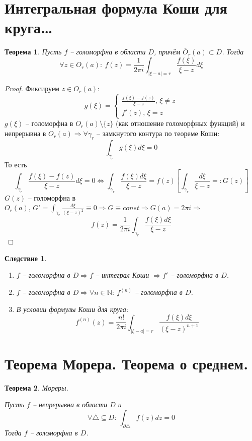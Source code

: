 \documentclass[a4paper,12pt]{article}
\theoremstyle{plain}
\newtheorem{theorem}{Теорема}[section]
\newtheorem*{corollary}{Следствие}
\theoremstyle{definition}
\theoremstyle{remark}
\begin{document}
\section{Интегральная формула Коши для круга\dots}
\begin{theorem}
	Пусть $f$ -- голоморфна в области $D$, причём $\overline{O}_r(a) \subset D$. Тогда
	\[
		\forall z \in O_r(a) :\: f(z) = \frac{1}{2\pi i} \int_{\vert \xi - a\vert = r}\frac{f(\xi)}{\xi - z}d\xi
	\]
\end{theorem}

\begin{proof}
	Фиксируем $z \in O_r(a)$:
	\[
		g(\xi) = \begin{cases}
			\frac{f(\xi) - f(z)}{\xi - z},\, \xi \neq z \\
			f'(z),\, \xi = z
		\end{cases}
	\]
	$g(\xi)$ -- голоморфна в $O_r(a) \setminus \{z\}$ (как отношение голоморфных функций) и непрерывна в $O_r(a) \Rightarrow \forall \gamma_r$ -- замкнутого контура по теореме Коши:
	\[
		\int_{\gamma_r}g(\xi)d\xi = 0
	\]
	То есть
	\[
		\int_{\gamma_r}\frac{f(\xi) - f(z)}{\xi - z}d\xi = 0 \Leftrightarrow
		\int_{\gamma_r}\frac{f(\xi)d\xi}{\xi - z} = f(z)\left[\int_{\gamma_r}\frac{d\xi}{\xi - z} =: G(z)\right]
	\]
	$G(z)$ -- голоморфна в $O_r(a),\, G' = \int_{\gamma_r} \frac{d\xi}{(\xi - z)^2} \equiv 0 \Rightarrow G \equiv const \Rightarrow G(a) = 2\pi i \Rightarrow$
	\[
		f(z) = \frac{1}{2\pi i} \int_{\gamma_r}\frac{f(\xi)d\xi}{\xi - z}
	\]
\end{proof}

\begin{corollary}
	\begin{enumerate}
		\item $f$ -- голоморфна в $D \Rightarrow f$ -- интеграл Коши $\Rightarrow f'$ -- голоморфна в $D$.
		\item $f$ -- голоморфна в $D \Rightarrow \forall n \in \mathbb{N} :\: f^{(n)}$ -- голоморфна в $D$.
		\item В условии формулы Коши для круга:
		      \begin{equation}\label{nElem}
			      f^{(n)}(z) = \frac{n!}{2\pi i} \int_{\vert \xi - a\vert = r} \frac{f(\xi)d\xi}{(\xi - z)^{n + 1}}
		      \end{equation}
	\end{enumerate}
\end{corollary}

\section{Теорема Морера. Теорема о среднем.}
\begin{theorem}
	Мореры.

	Пусть $f$ -- непрерывна в области $D$ и
	\[
		\forall \overline{\triangle} \subseteq D :\: \int_{\partial \triangle} f(z)dz = 0
	\]
	Тогда $f$ -- голоморфна в $D$.
\end{theorem}
\end{document}
